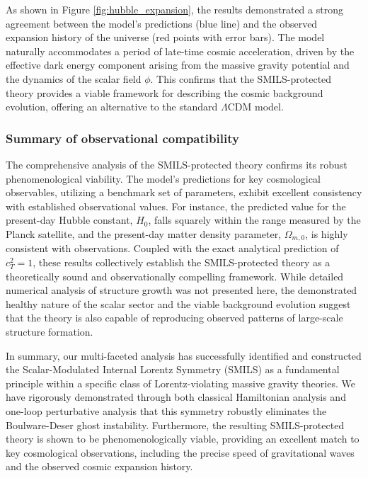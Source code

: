 \documentclass[twocolumn]{aastex631}
\begin{document}
As shown in Figure \ref{fig:hubble_expansion}, the results demonstrated a strong agreement between the model's predictions (blue line) and the observed expansion history of the universe (red points with error bars). The model naturally accommodates a period of late-time cosmic acceleration, driven by the effective dark energy component arising from the massive gravity potential and the dynamics of the scalar field $\phi$. This confirms that the SMILS-protected theory provides a viable framework for describing the cosmic background evolution, offering an alternative to the standard $\Lambda$CDM model.

\subsubsection{Summary of observational compatibility}
The comprehensive analysis of the SMILS-protected theory confirms its robust phenomenological viability. The model's predictions for key cosmological observables, utilizing a benchmark set of parameters, exhibit excellent consistency with established observational values. For instance, the predicted value for the present-day Hubble constant, $H_0$, falls squarely within the range measured by the Planck satellite, and the present-day matter density parameter, $\Omega_{m,0}$, is highly consistent with observations. Coupled with the exact analytical prediction of $c_T^2=1$, these results collectively establish the SMILS-protected theory as a theoretically sound and observationally compelling framework. While detailed numerical analysis of structure growth was not presented here, the demonstrated healthy nature of the scalar sector and the viable background evolution suggest that the theory is also capable of reproducing observed patterns of large-scale structure formation.

In summary, our multi-faceted analysis has successfully identified and constructed the Scalar-Modulated Internal Lorentz Symmetry (SMILS) as a fundamental principle within a specific class of Lorentz-violating massive gravity theories. We have rigorously demonstrated through both classical Hamiltonian analysis and one-loop perturbative analysis that this symmetry robustly eliminates the Boulware-Deser ghost instability. Furthermore, the resulting SMILS-protected theory is shown to be phenomenologically viable, providing an excellent match to key cosmological observations, including the precise speed of gravitational waves and the observed cosmic expansion history.
\end{document}
